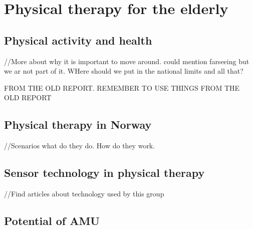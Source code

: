 \chapter{Physical therapy for the elderly}

\section{Physical activity and health}
//More about why it is important to move around. could mention farseeing but we ar not part of it. WHere should we put in the national limits and all that?

FROM THE OLD REPORT. REMEMBER TO USE THINGS FROM THE OLD REPORT

\section{Physical therapy in Norway}
//Scenarios what do they do. How do they work.

\section{Sensor technology in physical therapy}
//Find articles about technology used by this group

\section{Potential of AMU}
